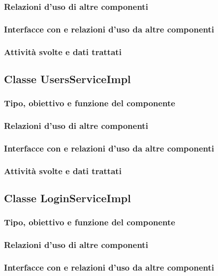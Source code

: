 \subsubsection*{Relazioni d'uso di altre componenti}
\subsubsection*{Interfacce con e relazioni d'uso da altre componenti}
\subsubsection*{Attivit\`a svolte e dati trattati}

\subsection{Classe UsersServiceImpl}
\subsubsection*{Tipo, obiettivo e funzione del componente}
\subsubsection*{Relazioni d'uso di altre componenti}
\subsubsection*{Interfacce con e relazioni d'uso da altre componenti}
\subsubsection*{Attivit\`a svolte e dati trattati}

\subsection{Classe LoginServiceImpl}
\subsubsection*{Tipo, obiettivo e funzione del componente}
\subsubsection*{Relazioni d'uso di altre componenti}
\subsubsection*{Interfacce con e relazioni d'uso da altre componenti}
